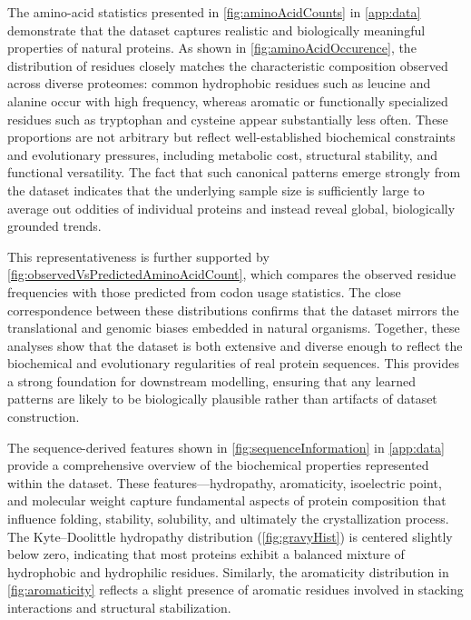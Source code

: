 The amino-acid statistics presented in \autoref{fig:aminoAcidCounts} in \autoref{app:data} demonstrate that the dataset captures realistic and biologically meaningful properties of natural proteins. As shown in \autoref{fig:aminoAcidOccurence}, the distribution of residues closely matches the characteristic composition observed across diverse proteomes: common hydrophobic residues such as leucine and alanine occur with high frequency, whereas aromatic or functionally specialized residues such as tryptophan and cysteine appear substantially less often. These proportions are not arbitrary but reflect well-established biochemical constraints and evolutionary pressures, including metabolic cost, structural stability, and functional versatility. The fact that such canonical patterns emerge strongly from the dataset indicates that the underlying sample size is sufficiently large to average out oddities of individual proteins and instead reveal global, biologically grounded trends.

This representativeness is further supported by \autoref{fig:observedVsPredictedAminoAcidCount}, which compares the observed residue frequencies with those predicted from codon usage statistics. The close correspondence between these distributions confirms that the dataset mirrors the translational and genomic biases embedded in natural organisms. Together, these analyses show that the dataset is both extensive and diverse enough to reflect the biochemical and evolutionary regularities of real protein sequences. This provides a strong foundation for downstream modelling, ensuring that any learned patterns are likely to be biologically plausible rather than artifacts of dataset construction.



The sequence-derived features shown in \autoref{fig:sequenceInformation} in \autoref{app:data} provide a comprehensive overview of the biochemical properties represented within the dataset. These features—hydropathy, aromaticity, isoelectric point, and molecular weight capture fundamental aspects of protein composition that influence folding, stability, solubility, and ultimately the crystallization process. The Kyte–Doolittle hydropathy distribution (\autoref{fig:gravyHist}) is centered slightly below zero, indicating that most proteins exhibit a balanced mixture of hydrophobic and hydrophilic residues. Similarly, the aromaticity distribution in \autoref{fig:aromaticity} reflects a slight presence of aromatic residues involved in stacking interactions and structural stabilization.

